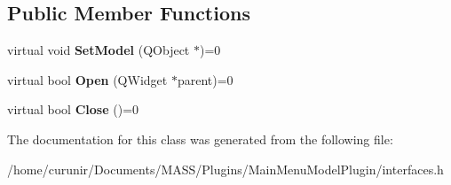 \subsection*{Public Member Functions}
\begin{DoxyCompactItemize}
\item 
virtual void {\bfseries Set\+Model} (Q\+Object $\ast$)=0\hypertarget{class_i_view_plugin_a119545ceff6d7c5deaf9f1dd817af171}{}\label{class_i_view_plugin_a119545ceff6d7c5deaf9f1dd817af171}

\item 
virtual bool {\bfseries Open} (Q\+Widget $\ast$parent)=0\hypertarget{class_i_view_plugin_a2eb2d20d1d438fee58cd5a6405efdef2}{}\label{class_i_view_plugin_a2eb2d20d1d438fee58cd5a6405efdef2}

\item 
virtual bool {\bfseries Close} ()=0\hypertarget{class_i_view_plugin_a167e8ed723d3164652351d03e6db6869}{}\label{class_i_view_plugin_a167e8ed723d3164652351d03e6db6869}

\end{DoxyCompactItemize}


The documentation for this class was generated from the following file\+:\begin{DoxyCompactItemize}
\item 
/home/curunir/\+Documents/\+M\+A\+S\+S/\+Plugins/\+Main\+Menu\+Model\+Plugin/interfaces.\+h\end{DoxyCompactItemize}
